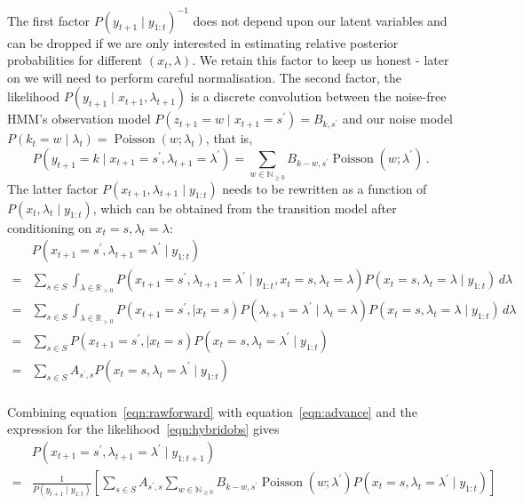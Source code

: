 \documentclass[twoside, 11pt]{article}
\DeclareMathOperator*{\poissond}{Poisson}
\newcommand{\reals}[0] {\mathbb{R}}
\newcommand{\nonnegint}[0] {\mathbb{N}_{\geq 0}}
\begin{document}
The first factor $P(y_{t+1} \mid y_{1:t})^{-1}$ does not depend upon our latent variables and can be dropped if we are only interested in estimating relative posterior probabilities for different $(x_t, \lambda)$. We retain this factor to keep us honest - later on we will need to perform careful normalisation. The second factor, the likelihood $P(y_{t+1} \mid x_{t+1}, \lambda_{t+1})$ is a discrete convolution between the noise-free HMM's observation model $P(z_{t+1}=w \mid x_{t+1}=s^{\prime}) = B_{k,s^{\prime}}$ and our noise model $P(k_t=w \mid \lambda_t) = \poissond(w ; \lambda_t)$, that is,
\begin{equation}
P(y_{t+1}=k \mid x_{t+1}=s^{\prime}, \lambda_{t+1}=\lambda^{\prime})
=
\sum_{w \in \nonnegint} B_{k-w,s^{\prime}} \poissond(w ; \lambda^{\prime}) \, .
\end{equation}
The latter factor $P(x_{t+1}, \lambda_{t+1} \mid y_{1:t})$ needs to be rewritten as a function of $P(x_{t}, \lambda_{t} \mid y_{1:t})$, which can be obtained from the transition model after conditioning on $x_t=s, \lambda_t=\lambda$:
\begin{align}
& P(x_{t+1}=s^{\prime}, \lambda_{t+1}=\lambda^{\prime} \mid y_{1:t}) \nonumber \\
= & \sum_{s \in S} \int_{\lambda \in \reals_{>0}}
P(x_{t+1}=s^{\prime}, \lambda_{t+1}=\lambda^{\prime} \mid y_{1:t}, x_t=s, \lambda_t=\lambda ) P(x_t=s, \lambda_t=\lambda \mid y_{1:t} ) \,d\lambda \nonumber \\
= & \sum_{s \in S} \int_{\lambda \in \reals_{>0}}
P(x_{t+1}=s^{\prime}, \mid x_t=s)
P(\lambda_{t+1}=\lambda^{\prime} \mid \lambda_t=\lambda ) P(x_t=s, \lambda_t=\lambda \mid y_{1:t} ) \,d\lambda \nonumber \\
= & \sum_{s \in S}
P(x_{t+1}=s^{\prime}, \mid x_t=s)
P(x_t=s, \lambda_t=\lambda^{\prime} \mid y_{1:t} ) \nonumber \\
= & \sum_{s \in S}
A_{s^{\prime}, s}
P(x_t=s, \lambda_t=\lambda^{\prime} \mid y_{1:t} ) \nonumber \\
\label{eqn:advance}
\end{align}

Combining equation~\ref{eqn:rawforward} with equation~\ref{eqn:advance} and the expression for the likelihood~\ref{eqn:hybridobs} gives
\begin{align}
& P(x_{t+1}=s^{\prime}, \lambda_{t+1}=\lambda^{\prime} \mid y_{1:{t+1}}) \nonumber \\
= &
\frac{1}{P(y_{t+1} \mid y_{1:t})}
\left[
\sum_{s \in S}
A_{s^{\prime}, s}
\sum_{w \in \nonnegint}
B_{k-w,s^{\prime}} \poissond(w ; \lambda^{\prime})
P(x_t=s, \lambda_t=\lambda^{\prime} \mid y_{1:t} )
\right]
\end{align}
\end{document}
